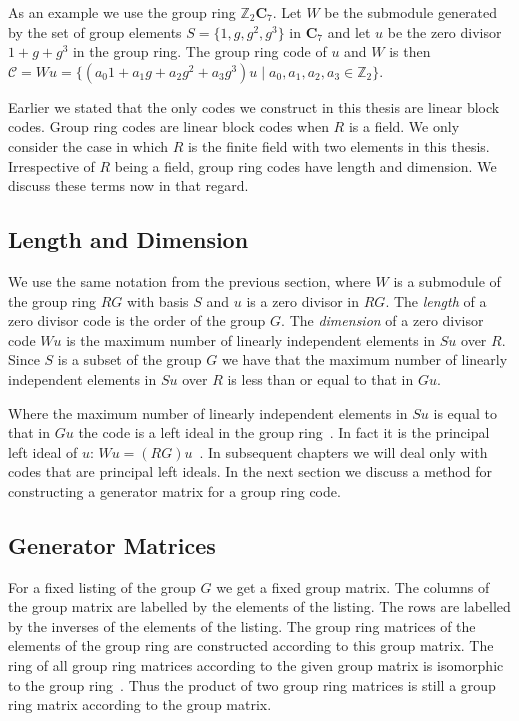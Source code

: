 As an example we use the group ring $\mathbb{Z}_2 \mathbf{C}_7$. 
Let $W$ be the submodule generated by the set of group elements $S = \{1,g,g^2,g^3\}$ in $\mathbf{C}_7$ and let $u$ be the zero divisor $1+g+g^3$ in the group ring.
The group ring code of $u$ and $W$ is then $\mathcal{C} = Wu = \{ (a_0 1 + a_1 g + a_2 g^2 + a_3 g^3)u \mid a_0,a_1,a_2,a_3 \in \mathbb{Z}_2 \}$.

Earlier we stated that the only codes we construct in this thesis are linear block codes.
Group ring codes are linear block codes when $R$ is a field.
We only consider the case in which $R$ is the finite field with two elements in this thesis.
Irrespective of $R$ being a field, group ring codes have length and dimension.
We discuss these terms now in that regard.

\subsection{Length and Dimension}
We use the same notation from the previous section, where $W$ is a submodule of the group ring $RG$ with basis $S$ and $u$ is a zero divisor in $RG$.
The \emph{length} of a zero divisor code is the order of the group $G$.
The \emph{dimension} of a zero divisor code $Wu$ is the maximum number of linearly independent elements in $Su$ over $R$.
Since $S$ is a subset of the group $G$ we have that the maximum number of linearly independent elements in $Su$ over $R$ is less than or equal to that in $Gu$.

Where the maximum number of linearly independent elements in $Su$ is equal to that in $Gu$ the code is a left ideal in the group ring~\cite{hur07,hur09}.
In fact it is the principal left ideal of $u$: $Wu = (RG)u$~\cite{hur07,hur09}.
In subsequent chapters we will deal only with codes that are principal left ideals.
In the next section we discuss a method for constructing a generator matrix for a group ring code.

\subsection{Generator Matrices}
\label{sect:rggeneratormatrices}
For a fixed listing of the group $G$ we get a fixed group matrix.
The columns of the group matrix are labelled by the elements of the listing.
The rows are labelled by the inverses of the elements of the listing.
The group ring matrices of the elements of the group ring are constructed according to this group matrix.
The ring of all group ring matrices according to the given group matrix is isomorphic to the group ring~\cite{hur09}.
Thus the product of two group ring matrices is still a group ring matrix according to the group matrix.

